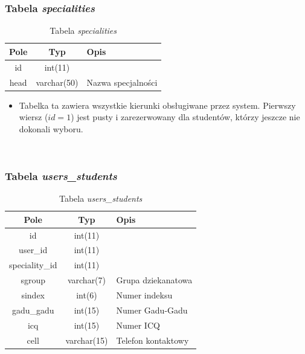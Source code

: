 \documentclass[a4paper,12pt,oneside]{report}
\begin{document}
\subsubsection{Tabela \emph{specialities}}
\label{subsub:specialities}

\begin{table}[h]
  \centering
  \begin{tabular}{|c|c|l|}\hline
  Pole & Typ & Opis \\\hline
  id              & int(11)      & \\
  head & varchar(50) & Nazwa specjalności \\\hline
  \end{tabular}
  \caption{Tabela \emph{specialities}\label{tab:specialities}}
\end{table}

\begin{itemize}
  \item Tabelka ta zawiera wszystkie kierunki obsługiwane przez system. Pierwszy wiersz ($id = 1$) jest pusty i zarezerwowany dla studentów, którzy jeszcze nie dokonali wyboru.
\end{itemize}

~\newline

\subsubsection{Tabela \emph{users\_students}}
\label{subsub:users_students}

\begin{table}[h]
  \centering
  \begin{tabular}{|c|c|l|}\hline
  Pole & Typ & Opis \\\hline
  id             & int(11)     & \\
  user\_id       & int(11)     & \\
  speciality\_id & int(11)     & \\
  sgroup         & varchar(7)  & Grupa dziekanatowa\\
  sindex         & int(6)      & Numer indeksu \\
  gadu\_gadu     & int(15)     & Numer Gadu-Gadu \\
  icq            & int(15)     & Numer ICQ \\
  cell           & varchar(15) & Telefon kontaktowy \\\hline

  \end{tabular}
  \caption{Tabela \emph{users\_students}\label{tab:users_students}}
\end{table}
\end{document}
